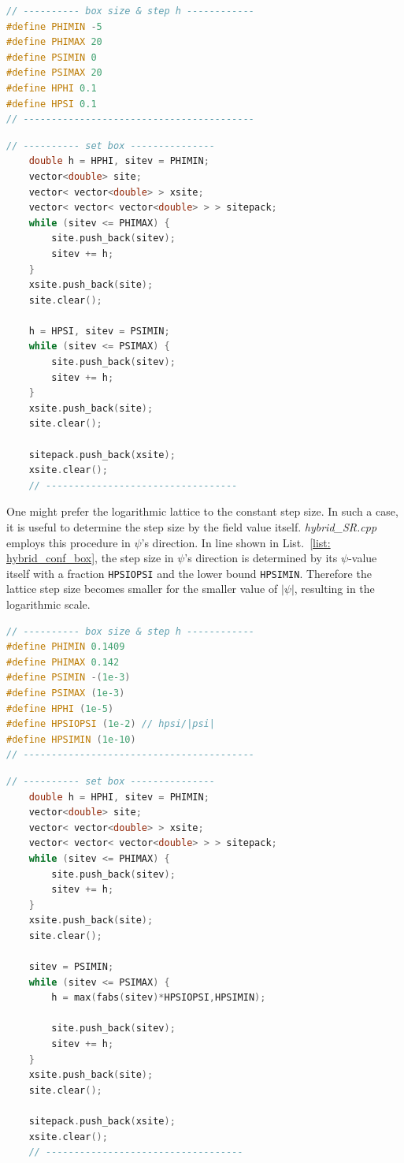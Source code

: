 \documentclass[aps, prd
, preprint
, nofootinbib 
, notitlepage
, superscriptaddress
, longbibliography
]{revtex4-1}
\newcommand{\Blue}[1]{\textcolor{blue}{\sffamily #1}}
\begin{document}
\begin{lstlisting}[language = C++, caption={\textit{sample/double\_chaotic\_SR.cpp}}, label=list: double_chaotic_conf_box, firstnumber = 6]
// ---------- box size & step h ------------
#define PHIMIN -5
#define PHIMAX 20
#define PSIMIN 0
#define PSIMAX 20
#define HPHI 0.1
#define HPSI 0.1
// -----------------------------------------
\end{lstlisting}
\begin{lstlisting}[language = C++, firstnumber = 52]
	// ---------- set box ---------------
	double h = HPHI, sitev = PHIMIN;
	vector<double> site;
	vector< vector<double> > xsite;
	vector< vector< vector<double> > > sitepack;
	while (sitev <= PHIMAX) {
		site.push_back(sitev);
		sitev += h;
	}
	xsite.push_back(site);
	site.clear();

	h = HPSI, sitev = PSIMIN;
	while (sitev <= PSIMAX) {
		site.push_back(sitev);
		sitev += h;
	}
	xsite.push_back(site);
	site.clear();
	
	sitepack.push_back(xsite);
	xsite.clear();
	// ----------------------------------
\end{lstlisting}

One might prefer the logarithmic lattice to the constant step size. In such a case, it is useful to determine the step size by the field value itself.
\textit{hybrid\_SR.cpp} employs this procedure in $\psi$'s direction.
In line \Blue{70} shown in List.~\ref{list: hybrid_conf_box}, the step size in $\psi$'s direction is determined by its $\psi$-value itself with a fraction \texttt{HPSIOPSI}
and the lower bound \texttt{HPSIMIN}. Therefore the lattice step size becomes smaller for the smaller value of $|\psi|$, resulting in the logarithmic scale.

\begin{lstlisting}[language = C++, caption={\textit{sample/hybrid\_SR.cpp}}, label=list: hybrid_conf_box, firstnumber = 6]
// ---------- box size & step h ------------
#define PHIMIN 0.1409
#define PHIMAX 0.142
#define PSIMIN -(1e-3)
#define PSIMAX (1e-3)
#define HPHI (1e-5)
#define HPSIOPSI (1e-2) // hpsi/|psi|
#define HPSIMIN (1e-10)
// -----------------------------------------
\end{lstlisting}
\begin{lstlisting}[language = C++, firstnumber = 58]
	// ---------- set box ---------------
	double h = HPHI, sitev = PHIMIN;
	vector<double> site;
	vector< vector<double> > xsite;
	vector< vector< vector<double> > > sitepack;
	while (sitev <= PHIMAX) {
		site.push_back(sitev);
		sitev += h;
	}
	xsite.push_back(site);
	site.clear();

	sitev = PSIMIN;
	while (sitev <= PSIMAX) {
		h = max(fabs(sitev)*HPSIOPSI,HPSIMIN);

		site.push_back(sitev);
		sitev += h;	
	}
	xsite.push_back(site);
	site.clear();
	
	sitepack.push_back(xsite);
	xsite.clear();
	// -----------------------------------
\end{lstlisting}
\end{document}
